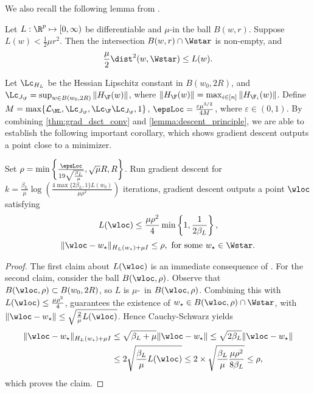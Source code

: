 We also recall the following lemma from \citet{liu2023aiming}.
    \begin{lemma}
    \label{lemma:descent_principle}
        Let $L:\R^p\mapsto [0,\infty)$ be differentiable and $\mu$-\PL in the ball $B(w,r)$. 
        Suppose $L(w)<\frac{1}{2}\mu r^2$.
        Then the intersection $B(w,r)\cap \Wstar$ is non-empty, and
        \[
        \frac{\mu}{2}\dist^2(w,\Wstar)\leq L(w).
        \]
    \end{lemma}
        Let $\Lc_{H_L}$ be the Hessian Lipschitz constant in $B(w_0,2R)$, and $\Lc_{J_\F} = \sup_{w\in B(w_0,2R)}\|H_\F(w)\|$, where $\|H_\F(w)\| = \max_{i\in [n]}\|H_{\F_i}(w)\|$. 
        Define $M = \max\{\mathcal L_{\HL},\Lc_{J_\F},\mathcal \Lc_\F \Lc_{J_\F},1\}$,  $\epsLoc = \frac{\varepsilon \mu^{3/2}}{4M}$, where $\varepsilon\in (0,1)$.
        By combining \cref{thm:grad_dsct_conv} and \cref{lemma:descent_principle}, we are able to establish the following important corollary, which shows gradient descent outputs a point close to a minimizer.
    \begin{corollary}
        \label{corr:close_to_min}
        Set $\rho =  \min\left\{\frac{\epsLoc}{19\sqrt{\frac{\beta_L}{\mu}}},\sqrt{\mu}R,R\right\}$.
        Run gradient descent for $k = \frac{\beta_L}{\mu}\log\left(\frac{4\max\{2\beta_{L},1\}L(w_0)}{\mu\rho^2}\right)$ iterations, 
        gradient descent outputs a point $\wloc$ satisfying 
        \[
        L(\wloc) \leq \frac{\mu \rho^2}{4}\min\left\{1,\frac{1}{2\beta_L}\right\},
        \]
        \[
        \|\wloc-w_\star\|_{H_{L}(w_\star)+\mu I}\leq \rho,~ \text{for some}~ w_\star\in \Wstar.
        \]
    \end{corollary}
\begin{proof}
    The first claim about $L(\wloc)$ is an immediate consequence of .
    For the second claim, consider the ball $B(\wloc,\rho)$.
    Observe that $B(\wloc,\rho)\subset B(w_0,2R)$, so $L$ is $\mu$-\PL~in $B(\wloc,\rho)$.
    Combining this with $L(\wloc) \leq \frac{\mu \rho^2}{4}$,  guarantees the existence of $w_\star\in B(\wloc,\rho)\cap\Wstar$, with 
    $\|\wloc-w_\star\|\leq \sqrt{\frac{2}{\mu}L(\wloc)}$.
    Hence Cauchy-Schwarz yields 
    \begin{align*}
        \|\wloc-w_\star\|_{H_L(w_\star)+\mu I} & \leq \sqrt{\beta_L+\mu}\|\wloc-w_\star\| \leq \sqrt{2\beta_L}\|\wloc-w_\star\|\\
        & \leq 2\sqrt{\frac{\beta_L}{\mu}L(\wloc)} \leq 2 \times \sqrt{\frac{\beta_L}{\mu}\frac{\mu \rho^2}{8{\beta_L}}}\leq \rho,
    \end{align*}
   which proves the claim.
\end{proof}

